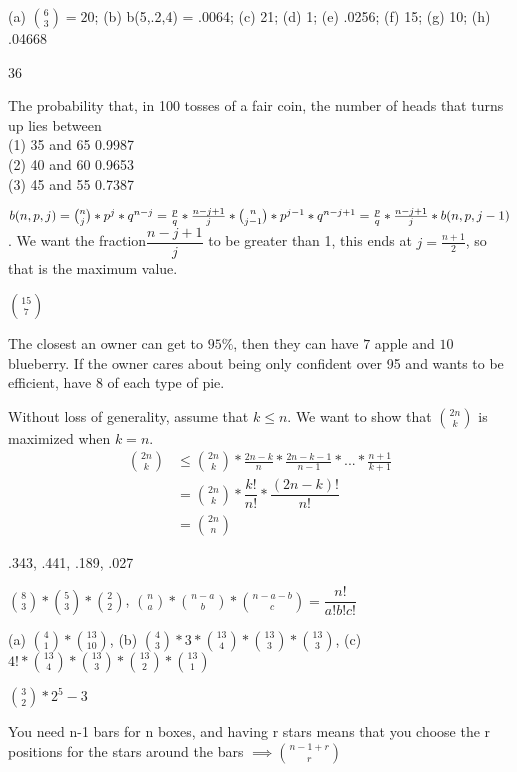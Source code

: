 	\begin{oddenumerate}
	\item (a) $ \binom{6}{3} = 20 $; (b) b(5,.2,4) = .0064; (c) 21; (d) 1; (e) .0256; (f) 15; (g) 10; (h) .04668 
	\item 36
	\item The probability that, in 100 tosses of a fair coin, the number of heads that turns up lies between
	\\ (1) 35 and 65 0.9987
	\\ (2) 40 and 60 0.9653
	\\ (3) 45 and 55 0.7387
	\item $ b(n,p,j) = \binom{n}{j} * p^j *q^{n-j} = \frac{p}{q} * \frac{n-j+1}{j} * \binom{n}{j-1} * p^{j-1}*q^{n-j+1}
	= \\ \frac{p}{q} * \frac{n-j+1}{j} * b(n,p,j-1)$. We want the fraction$  \dfrac{n-j+1}{j}  $ to be greater than 1, this ends at $ j = \frac{n+1}{2} $, so that is the maximum value.
	\item $ \binom{15}{7} $
	\item The closest an owner can get to $ 95 \% $, then they can have $ 7 $ apple and $ 10 $ blueberry. If the owner cares about being only confident over 95 and wants to be efficient, have $ 8 $ of each type of pie.
	\item Without loss of generality, assume that $ k \leq n $. We want to show that $ \binom{2n}{k} $ is maximized when $ k = n $. 
	\begin{align*}
		\binom{2n}{k} &\leq \binom{2n}{k} * \frac{2n - k}{n} * \frac{2n - k - 1}{n - 1}*...*\frac{n+1}{k+1}
		\\ &= \binom{2n}{k} * \dfrac{k!}{n!} * \dfrac{(2n-k)!}{n!}
		\\ &= \binom{2n}{n}
	\end{align*}
	\item .343, .441, .189, .027
	\item$  \binom{8}{3} * \binom{5}{3} * \binom{2}{2} $, $ \binom{n}{a} * \binom{n-a}{b}  * \binom{n-a-b}{c}   = \dfrac{n!}{a!b!c!} $
	\item (a) $ \binom{4}{1} *\binom{13}{10}  $, (b) $ \binom{4}{3}  * 3 * \binom{13}{4}  * \binom{13}{3}  * \binom{13}{3} $, 
	(c) $ 4! * \binom{13}{4}  * \binom{13}{3}* \binom{13}{2} * \binom{13}{1}  $
	\item $ \binom{3}{2} * 2^5 - 3 $
	\item You need n-1 bars for n boxes, and having r stars means that you choose the r positions for the stars around the bars
	$ \implies \binom{n-1+r}{r}  $

\end{oddenumerate}
